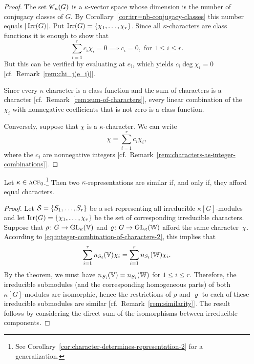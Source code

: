 \begin{proof}
    The set $\operatorname{\mathscr C}_\kappa(G)$ is a $\kappa$-vector space whose dimension is the number of conjugacy classes of $G$. By Corollary~\ref{cor:irr=nb-conjugacy-classes} this number equals $|\operatorname{Irr}(G)|$. Put $\operatorname{Irr}(G)=\{\chi_1,\dots,\chi_r\}$. Since all $\kappa$-characters are class functions it is enough to show that
    $$
        \sum_{i=1}^rc_i\chi_i=0
            \implies c_i=0,\text{ for }1\le i\le r.
    $$
    But this can be verified by evaluating at $e_i$, which yields $c_i\deg\chi_i=0$ [cf.~Remark~\ref{rem:chi_j(e_i)}].

    Since every $\kappa$-character is a class function and the sum of characters is a character [cf.~Remark~\ref{rem:sum-of-characters}], every linear combination of the $\chi_i$ with nonnegative coefficients that is not zero is a class function.

    Conversely, suppose that $\chi$ is a $\kappa$-character. We can write
    \begin{equation}\label{eq:character-basis}
        \chi = \sum_{i=1}^rc_i\chi_i,
    \end{equation}
    where the $c_i$ are nonnegative integers [cf.~Remark~\ref{rem:characters-as-integer-combinations}]. 
\end{proof}

\begin{cor}\label{cor:character-determines-representation-1}
    Let\/ $\kappa\in\operatorname{\textnormal{\textsc{acf}}}_0$.\footnote{See Corollary~\ref{cor:character-determines-representation-2} for a generalization.} Then two\/ $\kappa$-representations are similar if, and only if, they afford equal characters. 
\end{cor}

\begin{proof}
    Let $\mathcal S=\{S_1,\dots,S_r\}$ be a set representing all irreducible $\kappa[G]$-modules and let $\operatorname{Irr}(G)=\{\chi_1,\dots,\chi_r\}$ be the set of corresponding irreducible characters. Suppose that $\rho\colon G\to{\rm GL}_\kappa(\mathbb V)$ and $\varrho\colon G\to{\rm GL}_\kappa(\mathbb W)$ afford the same character~$\chi$. According to \eqref{eq:integer-combination-of-characters-2}, this implies that
    $$
        \sum_{i=1}^rn_{S_i}(\mathbb V)\chi_i=\sum_{i=1}^rn_{S_i}(\mathbb W)\chi_i.
    $$
    By the theorem, we must have $n_{S_i}(\mathbb V)=n_{S_i}(\mathbb W)$ for $1\le i\le r$. Therefore, the irreducible submodules (and the corresponding homogeneous parts) of both $\kappa[G]$-modules are isomorphic, hence the restrictions of $\rho$ and $\varrho$ to each of these irreducible submodules are similar [cf.~Remark~\ref{rem:similarity}]. The result follows by considering the direct sum of the isomorphisms between irreducible components.
\end{proof}

